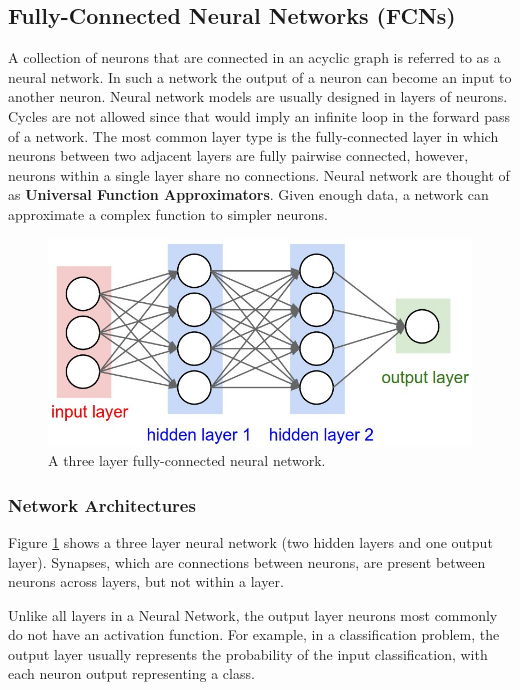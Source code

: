 \subsection{Fully-Connected Neural Networks (FCNs)}
A collection of neurons that are connected in an acyclic graph is referred to as a neural network. In such a network the output of a neuron can become an input to another neuron. Neural network models are usually designed in layers of neurons. Cycles are not allowed since that would imply an infinite loop in the forward pass of a network. The most common layer type is the fully-connected layer in which neurons between two adjacent layers are fully pairwise connected, however, neurons within a single layer share no connections. Neural network are thought of as \textbf{Universal Function Approximators}. Given enough data, a network can approximate a complex function to simpler neurons.
\begin{figure}[ht]
\includegraphics[trim={0cm 0cm 0cm 0cm},clip,width=\linewidth]{Figures/neural_net2.jpeg}
\centering
\caption{A three layer fully-connected neural network.}
\label{network_architecture}
\end{figure}
\subsubsection{Network Architectures}
Figure \ref{network_architecture} shows a three layer neural network (two hidden layers and one output layer). Synapses, which are connections between neurons, are present between neurons across layers, but not within a layer.

Unlike all layers in a Neural Network, the output layer neurons most commonly do not have an activation function. For example, in a classification problem, the output layer usually represents the probability of the input classification, with each neuron output representing a class. 

